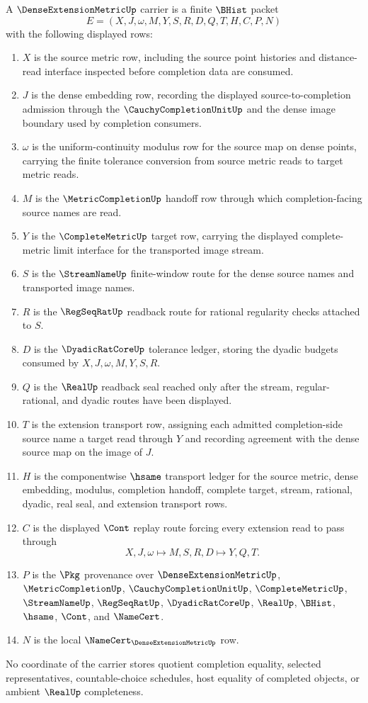 \begin{definition}
\label{def:dense-extension-metric-carrier}
A $\DenseExtensionMetricUp$ carrier is a finite $\BHist$ packet
$$
E=(X,J,\omega,M,Y,S,R,D,Q,T,H,C,P,N)
$$
with the following displayed rows:
\begin{enumerate}
\item $X$ is the source metric row, including the source point histories and distance-read interface inspected before completion data are consumed.
\item $J$ is the dense embedding row, recording the displayed source-to-completion admission through the $\CauchyCompletionUnitUp$ and the dense image boundary used by completion consumers.
\item $\omega$ is the uniform-continuity modulus row for the source map on dense points, carrying the finite tolerance conversion from source metric reads to target metric reads.
\item $M$ is the $\MetricCompletionUp$ handoff row through which completion-facing source names are read.
\item $Y$ is the $\CompleteMetricUp$ target row, carrying the displayed complete-metric limit interface for the transported image stream.
\item $S$ is the $\StreamNameUp$ finite-window route for the dense source names and transported image names.
\item $R$ is the $\RegSeqRatUp$ readback route for rational regularity checks attached to $S$.
\item $D$ is the $\DyadicRatCoreUp$ tolerance ledger, storing the dyadic budgets consumed by $X,J,\omega,M,Y,S,R$.
\item $Q$ is the $\RealUp$ readback seal reached only after the stream, regular-rational, and dyadic routes have been displayed.
\item $T$ is the extension transport row, assigning each admitted completion-side source name a target read through $Y$ and recording agreement with the dense source map on the image of $J$.
\item $H$ is the componentwise $\hsame$ transport ledger for the source metric, dense embedding, modulus, completion handoff, complete target, stream, rational, dyadic, real seal, and extension transport rows.
\item $C$ is the displayed $\Cont$ replay route forcing every extension read to pass through
$$
X,J,\omega \longmapsto M,S,R,D \longmapsto Y,Q,T .
$$
\item $P$ is the $\Pkg$ provenance over $\DenseExtensionMetricUp$, $\MetricCompletionUp$, $\CauchyCompletionUnitUp$, $\CompleteMetricUp$, $\StreamNameUp$, $\RegSeqRatUp$, $\DyadicRatCoreUp$, $\RealUp$, $\BHist$, $\hsame$, $\Cont$, and $\NameCert$.
\item $N$ is the local $\NameCert_{\DenseExtensionMetricUp}$ row.
\end{enumerate}
No coordinate of the carrier stores quotient completion equality, selected representatives, countable-choice schedules, host equality of completed objects, or ambient $\RealUp$ completeness.
\end{definition}
